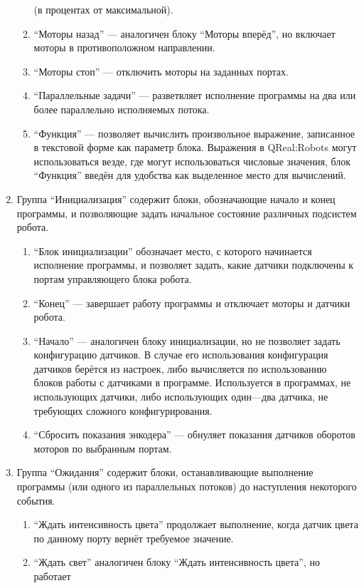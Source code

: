 \begin{enumerate}
\begin{enumerate}
				(в процентах от максимальной).
			\item "`Моторы назад"' --- аналогичен блоку "`Моторы вперёд"', но включает моторы 
				в противоположном направлении.
			\item "`Моторы стоп"'  --- отключить моторы на заданных портах.
			\item "`Параллельные задачи"' --- разветвляет исполнение программы на два или 
				более параллельно исполняемых потока.
			\item "`Функция"' --- позволяет вычислить произвольное выражение, записанное 
				в текстовой форме как параметр блока. Выражения в QReal:Robots могут использоваться 
				везде, где могут использоваться числовые значения, блок "`Функция"' введён 
				для удобства как выделенное место для вычислений.
		\end{enumerate}
	\item Группа "`Инициализация"' содержит блоки, обозначающие начало и конец программы, 
		и позволяющие задать начальное состояние различных подсистем робота.
		\begin{enumerate}
			\item "`Блок инициализации"' обозначает место, с которого начинается исполнение 
				программы, и позволяет задать, какие датчики подключены к портам управляющего 
				блока робота.
			\item "`Конец"' --- завершает работу программы и отключает моторы и датчики робота.
			\item "`Начало"' --- аналогичен блоку инициализации, но не позволяет задать 
				конфигурацию датчиков. В случае его использования конфигурация датчиков берётся 
				из настроек, либо вычисляется по использованию блоков работы с датчиками в 
				программе. Используется в программах, не использующих датчики, либо использующих 
				один---два датчика, не требующих сложного конфигурирования.
			\item "`Сбросить показания энкодера"' --- обнуляет показания датчиков оборотов 
				моторов по выбранным портам.
		\end{enumerate}
	\item Группа "`Ожидания"' содержит блоки, останавливающие выполнение программы (или 
		одного из параллельных потоков) до наступления некоторого события.
		\begin{enumerate}
			\item "`Ждать интенсивность цвета"' продолжает выполнение, когда датчик цвета 
				по данному порту вернёт требуемое значение.
			\item "`Ждать свет"' аналогичен блоку "`Ждать интенсивность цвета"', но работает 

\end{enumerate}
\end{enumerate}
